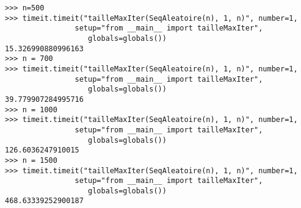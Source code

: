 \documentclass[french]{article}
\begin{document}
\begin{lstlisting}
>>> n=500
>>> timeit.timeit("tailleMaxIter(SeqAleatoire(n), 1, n)", number=1,
                setup="from __main__ import tailleMaxIter",
                   globals=globals())
15.326990880996163
>>> n = 700
>>> timeit.timeit("tailleMaxIter(SeqAleatoire(n), 1, n)", number=1,
                setup="from __main__ import tailleMaxIter",
                   globals=globals())
39.779907284995716
>>> n = 1000
>>> timeit.timeit("tailleMaxIter(SeqAleatoire(n), 1, n)", number=1,
                setup="from __main__ import tailleMaxIter",
                   globals=globals())
126.6036247910015
>>> n = 1500
>>> timeit.timeit("tailleMaxIter(SeqAleatoire(n), 1, n)", number=1,
                setup="from __main__ import tailleMaxIter",
                   globals=globals())
468.63339252900187
\end{lstlisting}

\pagebreak
\end{document}
